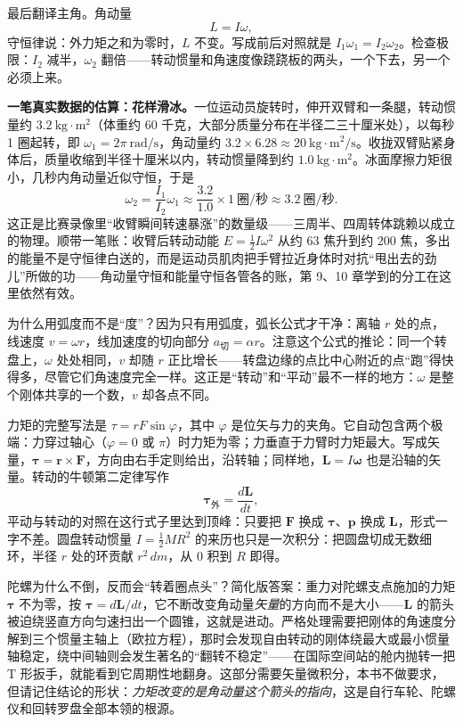 \begin{mainline}
最后翻译主角。角动量
\[
  L=I\omega ,
\]
守恒律说：外力矩之和为零时，\(L\) 不变。写成前后对照就是 \(I_1\omega_1=I_2\omega_2\)。检查极限：\(I_2\) 减半，\(\omega_2\) 翻倍——转动惯量和角速度像跷跷板的两头，一个下去，另一个必须上来。
\end{mainline}

\textbf{一笔真实数据的估算：花样滑冰。}一位运动员旋转时，伸开双臂和一条腿，转动惯量约 \(3.2\ \mathrm{kg\cdot m^2}\)（体重约 60 千克，大部分质量分布在半径二三十厘米处），以每秒 1 圈起转，即 \(\omega_1=2\pi\ \mathrm{rad/s}\)，角动量约 \(3.2\times6.28\approx20\ \mathrm{kg\cdot m^2/s}\)。收拢双臂贴紧身体后，质量收缩到半径十厘米以内，转动惯量降到约 \(1.0\ \mathrm{kg\cdot m^2}\)。冰面摩擦力矩很小，几秒内角动量近似守恒，于是
\[
  \omega_2=\frac{I_1}{I_2}\omega_1\approx\frac{3.2}{1.0}\times 1\ \text{圈/秒}\approx 3.2\ \text{圈/秒}.
\]
这正是比赛录像里“收臂瞬间转速暴涨”的数量级——三周半、四周转体跳赖以成立的物理。顺带一笔账：收臂后转动动能 \(E=\tfrac12 I\omega^2\) 从约 \(63\) 焦升到约 \(200\) 焦，多出的能量不是守恒律白送的，而是运动员肌肉把手臂拉近身体时对抗“甩出去的劲儿”所做的功——角动量守恒和能量守恒各管各的账，第 9、10 章学到的分工在这里依然有效。

\begin{mathbridge}
为什么用弧度而不是“度”？因为只有用弧度，弧长公式才干净：离轴 \(r\) 处的点，线速度 \(v=\omega r\)，线加速度的切向部分 \(a_{\text{切}}=\alpha r\)。注意这个公式的推论：同一个转盘上，\(\omega\) 处处相同，\(v\) 却随 \(r\) 正比增长——转盘边缘的点比中心附近的点“跑”得快得多，尽管它们角速度完全一样。这正是“转动”和“平动”最不一样的地方：\(\omega\) 是整个刚体共享的一个数，\(v\) 却各点不同。

力矩的完整写法是 \(\tau=rF\sin\varphi\)，其中 \(\varphi\) 是位矢与力的夹角。它自动包含两个极端：力穿过轴心（\(\varphi=0\) 或 \(\pi\)）时力矩为零；力垂直于力臂时力矩最大。写成矢量，\(\bm{\tau}=\bm r\times\bm F\)，方向由右手定则给出，沿转轴；同样地，\(\bm L=I\bm\omega\) 也是沿轴的矢量。转动的牛顿第二定律写作
\[
  \bm\tau_{\text{外}}=\frac{d\bm L}{dt},
\]
平动与转动的对照在这行式子里达到顶峰：只要把 \(\bm F\) 换成 \(\bm\tau\)、\(\bm p\) 换成 \(\bm L\)，形式一字不差。圆盘转动惯量 \(I=\tfrac12MR^2\) 的来历也只是一次积分：把圆盘切成无数细环，半径 \(r\) 处的环贡献 \(r^2\,dm\)，从 \(0\) 积到 \(R\) 即得。
\end{mathbridge}

\begin{challenge}
陀螺为什么不倒，反而会“转着圈点头”？简化版答案：重力对陀螺支点施加的力矩 \(\bm\tau\) 不为零，按 \(\bm\tau=d\bm L/dt\)，它不断改变角动量\emph{矢量}的方向而不是大小——\(\bm L\) 的箭头被迫绕竖直方向匀速扫出一个圆锥，这就是进动。严格处理需要把刚体的角速度分解到三个惯量主轴上（欧拉方程），那时会发现自由转动的刚体绕最大或最小惯量轴稳定，绕中间轴则会发生著名的“翻转不稳定”——在国际空间站的舱内抛转一把 T 形扳手，就能看到它周期性地翻身。这部分需要矢量微积分，本书不做要求，但请记住结论的形状：\emph{力矩改变的是角动量这个箭头的指向}，这是自行车轮、陀螺仪和回转罗盘全部本领的根源。
\end{challenge}

